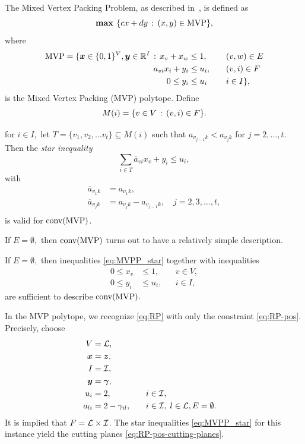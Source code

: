 The Mixed Vertex Packing Problem, as described in~\cite{atamturk_mixed_2000}, is defined as
\[
    \text{\textbf{max }}\{cx + dy \,:\, (x,y) \in \text{MVP}\},
\]
where
\begin{align}
        \text{MVP} = \{
        \bm{x} \in \{0,1\}^V, \bm{y} \in \mathbb{R}^I \,:\, x_v + x_w &\leq 1, \quad &&(v,w) \in E \\
        a_{vi}x_i + y_i &\leq u_i, \quad &&(v,i) \in F \\
        0 \leq y_i &\leq u_i \quad &&i \in I
        \},
\end{align}
is the Mixed Vertex Packing (MVP) polytope.
Define
\[
    M(i) = \{v \in V \,:\, (v,i) \in F\}.
\]
\begin{proposition}
    for $i \in I, $ let $T = \{v_1, v_2, \dots v_t\} \subseteq M(i)$
    such that $a_{v_{j-1}k} < a_{v_{j}k}$ for $j = 2, \dots, t$.
    Then the \emph{star inequality}
    \begin{equation}\label{eq:MVPP_star}
        \sum_{i \in T} \overline{a}_{vi}x_v + y_i \leq u_i,
    \end{equation}
    with
    \[
        \begin{split}
            \overline{a}_{v_1 k} &= a_{v_1 k}, \\
            \overline{a}_{v_j k} &= a_{v_j k} - a_{v_{j-1}k}, \quad j=2,3,\dots,t, \\
        \end{split}
    \]
    is valid for $\text{conv}(\text{MVP})$.
\end{proposition}

If $E=\emptyset,$ then $\text{conv}(\text{MVP})$ turns out to have a relatively simple description.

\begin{theorem}
    If $E = \emptyset,$ then inequalities \eqref{eq:MVPP_star} together with inequalities
    \begin{align}
        0 \leq x_v &\leq 1, && v \in V, \\
        0 \leq y_i &\leq u_i, && i \in I,
    \end{align}
    are sufficient to describe $\text{conv}(\text{MVP}).$
\end{theorem}

In the MVP polytope, we recognize \eqref{eq:RP} with only the constraint \eqref{eq:RP-pos}.
Precisely, choose
\begin{align*}
    V &= \mathcal{L}, \\
    \bm{x} &= \bm{z}, \\
    I &= \mathcal{I}, \\
    \bm{y} &= \bm{\gamma}, \\
    u_i &= 2, \quad && i \in \mathcal{I}, \\
    a_{li} &= 2 - \gamma_{il}, \quad && i \in \mathcal{I},\; l \in \mathcal{L},
    E = \emptyset.
\end{align*}
It is implied that $F=\mathcal{L} \times \mathcal{I}$.
The star inequalities \eqref{eq:MVPP_star} for this instance yield the cutting planes \eqref{eq:RP-pos-cutting-planes}.